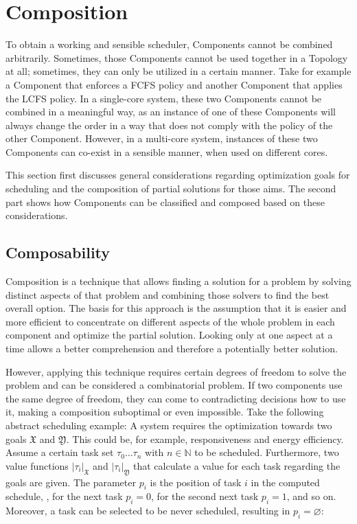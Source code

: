 \section{Composition}%
\label{sec:prop:compo}

To obtain a working and sensible scheduler, \cobas{} Components cannot be combined arbitrarily. Sometimes, those Components cannot be used together in a Topology at all; sometimes, they can only be utilized in a certain manner. Take for example a Component that enforces a \ac{FCFS} policy and another Component that applies the \ac{LCFS} policy. In a single-core system, these two Components cannot be combined in a meaningful way, as an instance of one of these Components will always change the order in a way that does not comply with the policy of the other Component. However, in a multi-core system, instances of these two Components can co-exist in a sensible manner, when used on different cores.

This section first discusses general considerations regarding optimization goals for scheduling and the composition of partial solutions for those aims. The second part shows how \cobas{} Components can be classified and composed based on these considerations.

\subsection{Composability}%
\label{sec:prop:compo:ability}

Composition is a technique that allows finding a solution for a problem by solving distinct aspects of that problem and combining those solvers to find the best overall option. The basis for this approach is the assumption that it is easier and more efficient to concentrate on different aspects of the whole problem in each component and optimize the partial solution. Looking only at one aspect at a time allows a better comprehension and therefore a potentially better solution.

However, applying this technique requires certain degrees of freedom to solve the problem and can be considered a combinatorial problem. If two components use the same degree of freedom, they can come to contradicting decisions how to use it, making a composition suboptimal or even impossible. Take the following abstract scheduling example: A system requires the optimization towards two goals \(\mathfrak{X}\) and \(\mathfrak{Y}\). This could be, for example, responsiveness and energy efficiency. Assume a certain task set \(\tau_0 \ldots \tau_n\) with \(n \in \mathbb{N}\) to be scheduled. Furthermore, two value functions \(|\tau_i|_\mathfrak{X}\) and \(|\tau_i|_\mathfrak{Y}\) that calculate a value for each task regarding the goals are given. The parameter \(p_i\) is the position of task \(i\) in the computed schedule, \eg{}, for the next task \(p_i = 0\), for the second next task \(p_i = 1\), and so on. Moreover, a task can be selected to be never scheduled, resulting in \(p_i = \varnothing\):

